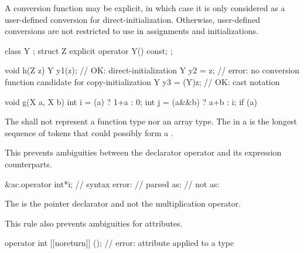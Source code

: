 \pnum
A conversion function may be explicit, in which case it is only considered as a user-defined conversion for direct-initialization. Otherwise, user-defined conversions are not restricted to use in assignments and initializations.
\begin{example}
\begin{codeblock}
class Y { };
struct Z {
  explicit operator Y() const;
};

void h(Z z) {
  Y y1(z);          // OK: direct-initialization
  Y y2 = z;         // error: no conversion function candidate for copy-initialization
  Y y3 = (Y)z;      // OK: cast notation
}

void g(X a, X b) {
  int i = (a) ? 1+a : 0;
  int j = (a&&b) ? a+b : i;
  if (a) {
  }
}
\end{codeblock}
\end{example}

\pnum
The
shall not represent a function type nor an array type.
The
in a
is the longest sequence of
tokens that could possibly form a .
\begin{note}
This prevents ambiguities between the declarator operator \tcode{*} and its expression
counterparts.
\begin{example}
\begin{codeblock}
&ac.operator int*i; // syntax error:
                    // parsed as: 
                    // not as: 
\end{codeblock}
The \tcode{*} is the pointer declarator and not the multiplication operator.
\end{example}
This rule also prevents ambiguities for attributes.
\begin{example}
\begin{codeblock}
operator int [[noreturn]] ();   // error:  attribute applied to a type
\end{codeblock}
\end{example}
\end{note}

